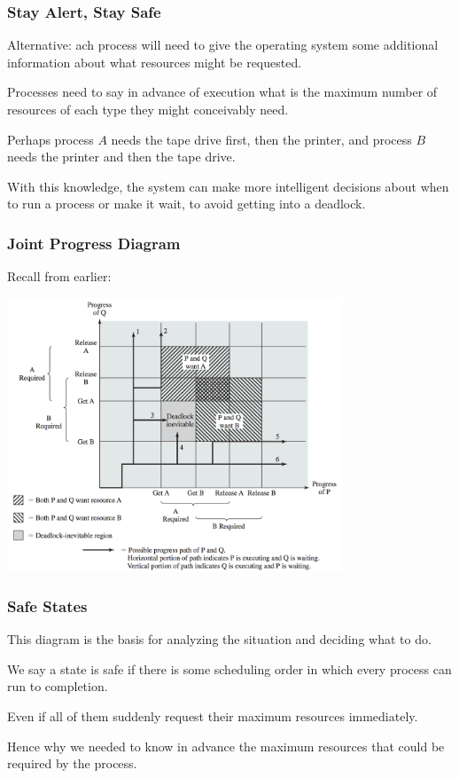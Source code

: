 \begin{frame}
\frametitle{Stay Alert, Stay Safe}

Alternative: ach process will need to give the operating system some additional information about what resources might be requested. 

Processes need to say in advance of execution what is the maximum number of resources of each type they might conceivably need. 

Perhaps process $A$ needs the tape drive first, then the printer, and process $B$ needs the printer and then the tape drive. 

With this knowledge, the system can make more intelligent decisions about when to run a process or make it wait, to avoid getting into a deadlock.

\end{frame}

\begin{frame}
\frametitle{Joint Progress Diagram}

Recall from earlier:

\begin{center}
\includegraphics[width=0.75\textwidth]{images/joint-progress}
\end{center}


\end{frame}

\begin{frame}
\frametitle{Safe States}

This diagram is the basis for analyzing the situation and deciding what to do.

We say a state is \alert{safe} if there is some scheduling order in which every process can run to completion.

Even if all of them suddenly request their maximum resources immediately. 

Hence why we needed to know in advance the maximum resources that could be required by the process. 

\end{frame}


